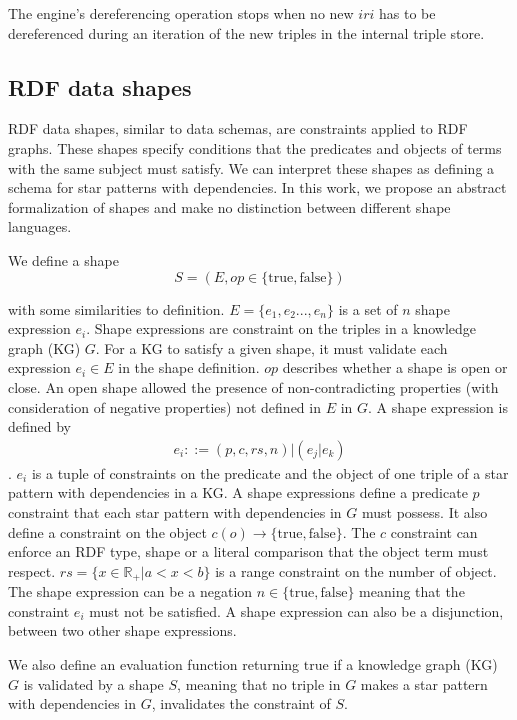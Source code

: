 The engine's dereferencing operation stops when no new $iri$ has to be dereferenced during an iteration of the new triples in the internal triple store.

\subsection{RDF data shapes}
RDF data shapes, similar to data schemas, are constraints applied to RDF graphs.
These shapes specify conditions that the predicates and objects of terms with the same subject must satisfy.
 We can interpret these shapes as defining a schema for star patterns with dependencies. 
 In this work, we propose an abstract formalization of shapes and make no distinction between different shape languages.~

We define a shape
\begin{equation}
S = (E, op \in \{\mathrm{true},\mathrm{false}\})
\end{equation}

with some similarities to \citeauthor{Abbas2018} definition.
$E = \{e_1, e_2 ..., e_{n}\}$ is a set of $n$ shape expression $e_i$.
Shape expressions are constraint on the triples in a knowledge graph (KG) $G$.
For a KG to satisfy a given shape, it must validate each expression $e_i \in E$ in the shape definition.
$op$ describes whether a shape is open or close.
An open shape allowed the presence of non-contradicting properties (with consideration of negative properties) not defined in $E$ in $G$.
A shape expression is defined by
\begin{align}
 e_i ::= (p, c, rs, n) | (e_j|e_k)
\end{align}
.
$e_i$ is a tuple of constraints on the predicate and the object of one triple of a star pattern with dependencies in a KG. 
A shape expressions define a predicate $p$ constraint that each star pattern with dependencies in $G$ must possess.
It also define a constraint on the object $c(o) \rightarrow \{\mathrm{true}, \mathrm{false}\}$.
The $c$ constraint can enforce an RDF type, shape or a literal comparison that the object term must respect.
$rs = \{x \in \mathbb{R}_+ | a < x < b \}$ is a range constraint on the number of object.
The shape expression can be a negation $n \in \{\mathrm{true}, \mathrm{false}\}$ meaning that the constraint $e_i$ must not be satisfied.
A shape expression can also be a disjunction, between two other shape expressions.

We also define an evaluation function returning $\mathrm{true}$ if a knowledge graph (KG) $G$ is validated by a shape $S$, 
meaning that no triple in $G$ makes a star pattern with dependencies in $G$, invalidates the constraint of $S$.

